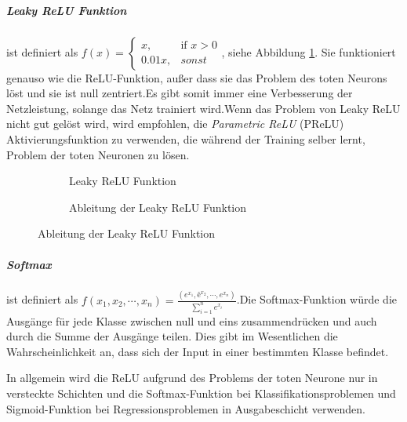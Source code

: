 \documentclass[12pt,a4paper]{scrartcl}
\numberwithin{equation}{section}
\begin{document}
\subparagraph{Leaky ReLU Funktion} ist definiert als $  f(x)= 
\begin{cases}
x,& \text{if } x  >  0\\
0.01x,              & sonst
\end{cases} $, siehe Abbildung \ref{fig:LReLU}. Sie funktioniert genauso wie die ReLU-Funktion, außer dass sie das Problem des toten Neurons löst und sie ist null zentriert.Es gibt somit immer eine Verbesserung der Netzleistung, solange das Netz trainiert wird.Wenn das Problem von Leaky ReLU nicht gut gelöst wird, wird empfohlen, die \textit{Parametric ReLU } (PReLU) Aktivierungsfunktion zu verwenden, die während der Training selber lernt, Problem der toten Neuronen zu lösen.
\begin{figure}[ht]
	\caption{Leaky ReLU Funktion}
	\begin{subfigure}{.5\textwidth}
		\centering
		\caption{Leaky ReLU Funktion}
	\end{subfigure}%
	\begin{subfigure}{.5\textwidth}
		\centering
		\caption{Ableitung der Leaky ReLU Funktion}
	\end{subfigure}
	
	\label{fig:LReLU}
	
\end{figure}




\subparagraph{Softmax} ist definiert als $ f(x_1, x_2, \cdots, x_n) = \frac{(e^{x_1}, ê^{x_2}, \cdots, e^{x_n})}{\sum_{i =1}^{n}{e^{x_i}}} $.Die Softmax-Funktion würde die Ausgänge für jede Klasse zwischen null und eins zusammendrücken und auch durch die Summe der Ausgänge teilen. Dies gibt im Wesentlichen die Wahrscheinlichkeit an, dass sich der Input in einer bestimmten Klasse befindet. 

In allgemein wird die ReLU aufgrund des Problems der toten Neurone nur in versteckte Schichten und die Softmax-Funktion bei Klassifikationsproblemen und Sigmoid-Funktion bei Regressionsproblemen in Ausgabeschicht verwenden.
\end{document}
